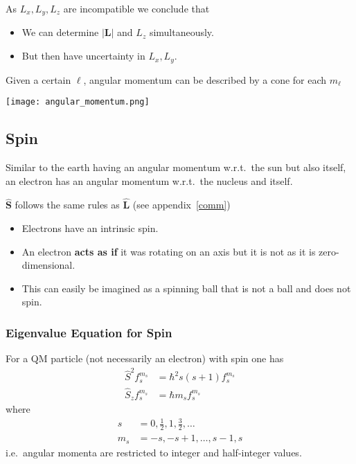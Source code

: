 \newpar{}
As $L_x, L_y, L_z$ are incompatible we conclude that
\begin{itemize}
    \item We can determine $|\mathbf{L}|$ and $L_{z}$ simultaneously.
    \item But then have uncertainty in $L_x, L_y$.
\end{itemize}
Given a certain $\ell$, angular momentum can be described by a cone for each $m_\ell$
\begin{center}
    \texttt{[image: angular\_momentum.png]}
\end{center}

\subsection{Spin}
Similar to the earth having an angular momentum w.r.t.\ the sun but also itself, an electron has an angular momentum w.r.t.\ the nucleus and itself.


$\widehat{\mathbf{S}}$ follows the same rules as $\widehat{\mathbf{L}}$ (see appendix\ \ref{comm})


\begin{itemize}
    \item Electrons have an intrinsic spin.
    \item An electron \textbf{acts as if} it was rotating on an axis but it is not as it is zero-dimensional.
    \item This can easily be imagined as a spinning ball that is not a ball and does not spin.
\end{itemize}


\subsubsection{Eigenvalue Equation for Spin}
For a QM particle (not necessarily an electron) with spin one has
\begin{align*}
    \widehat{S}^2f_{s}^{m_s}   & =\hbar^{2}s (s+1) f_{s}^{m_s} \\
    \widehat{S}_{z}f_{s}^{m_s} & =\hbar m_s f_{s}^{m_s}
\end{align*}
where
\begin{align*}
    s   & =0,\frac{1}{2},1,\frac{3}{2},\dots \\
    m_s & =-s, -s+1,\dots, s-1, s
\end{align*}
i.e.\ angular momenta are restricted to integer and half-integer values.

